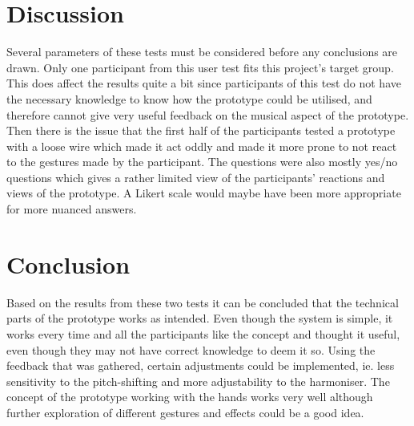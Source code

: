 \section{Discussion}
Several parameters of these tests must be considered before any conclusions are drawn. Only one participant from this user test fits this project's target group. This does affect the results quite a bit since participants of this test  do not have the necessary knowledge to know how the prototype could be utilised, and therefore cannot give very useful feedback on the musical aspect of the prototype.
Then there is the issue that the first half of the participants tested a prototype with a loose wire which made it act oddly and made it more prone to not react to the gestures made by the participant. The questions were also mostly yes/no questions which gives a rather limited view of the participants' reactions and views of the prototype. A Likert scale would maybe have been more appropriate for more nuanced answers.

\section{Conclusion}
Based on the results from these two tests it can be concluded that the technical parts of the prototype works as intended. Even though the system is simple, it works every time and all the participants like the concept and thought it useful, even though they may not have correct knowledge to deem it so. Using the feedback that was gathered, certain adjustments could be implemented, ie. less sensitivity to the pitch-shifting and more adjustability to the harmoniser. The concept of the prototype working with the hands works very well although further exploration of different gestures and effects could be a good idea. 



